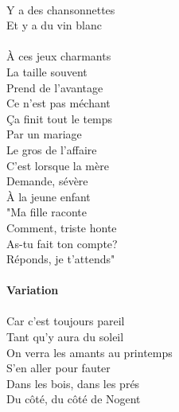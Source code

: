 \\Y a des chansonnettes
\\Et y a du vin blanc
\\\\À ces jeux charmants
\\La taille souvent
\\Prend de l'avantage
\\Ce n'est pas méchant
\\Ça finit tout le temps
\\Par un mariage
\\Le gros de l'affaire
\\C'est lorsque la mère
\\Demande, sévère
\\À la jeune enfant
\\"Ma fille raconte
\\Comment, triste honte
\\As-tu fait ton compte?
\\Réponds, je t'attends"
\\\\\textbf{Variation}
\\\\Car c'est toujours pareil
\\Tant qu'y aura du soleil
\\On verra les amants au printemps
\\S'en aller pour fauter
\\Dans les bois, dans les prés
\\Du côté, du côté de Nogent

\breakpage